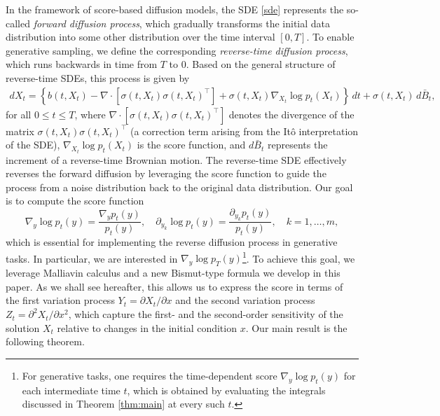 \documentclass[]{interact}
\newcommand{\1}{\mathbf{1}}
\theoremstyle{plain}%
\theoremstyle{definition}
\theoremstyle{remark}
\numberwithin{equation}{section}
\begin{document}
In the framework of score-based diffusion models, the SDE \eqref{sde} represents the so-called {\em forward diffusion process}, which gradually transforms the initial data distribution into some other distribution over the time interval \([0, T]\). To enable generative sampling, we define the corresponding {\em reverse-time diffusion process}, which runs backwards in time from \(T\) to \(0\). Based on the general structure of reverse-time SDEs, this process is given by
\begin{align}
dX_t = \left\{ b(t, X_t) - \nabla \cdot \left[\sigma(t, X_t) \sigma(t, X_t)^\top\right] + \sigma(t, X_t) \nabla_{X_t} \log p_t(X_t) \right\} \, dt + \sigma(t, X_t) \, d\bar{B}_t, 
\label{sde1}
\end{align}
for all $0 \leq t \leq T$, where \(\nabla \cdot [\sigma(t, X_t) \sigma(t, X_t)^\top]\) denotes the divergence of the matrix \(\sigma(t, X_t) \sigma(t, X_t)^\top\) (a correction term arising from the Itô interpretation of the SDE), \(\nabla_{X_t} \log p_t(X_t)\) is the score function, and \(d\bar{B}_t\) represents the increment of a reverse-time Brownian motion.
%
The reverse-time SDE effectively reverses the forward diffusion by leveraging 
the score function to guide the process from a noise distribution back to the 
original data distribution.
%
\noindent
Our goal is to compute the score function
\[
\nabla_y \log p_t(y) = \frac{\nabla_y p_t(y)}{p_t(y)}, \quad \partial_{y_k} \log p_t(y) = \frac{\partial_{y_k} p_t(y)}{p_t(y)}, \quad k = 1, \ldots, m,
\]
which is essential for implementing the reverse diffusion process in generative tasks. In particular, we are interested in \(\nabla_y \log p_T(y)\)\footnote{For generative tasks, one requires the time-dependent score \(\nabla_y\log p_t(y)\) for each intermediate time \(t\), which is obtained by evaluating the integrals discussed in Theorem \ref{thm:main} at every such \(t\).}. To achieve this goal, we leverage Malliavin calculus and a new Bismut-type formula we develop in this paper. As we shall see hereafter, this allows us to express the score in terms of the first variation process \(Y_t = \partial X_t/\partial x\) and the second variation process \(Z_t = \partial^2 X_t/\partial x^2\), which capture the first- and the second-order sensitivity of the solution \(X_t\) relative to changes in the initial condition \(x\).   
%
Our main result is the following theorem.

\end{document}
